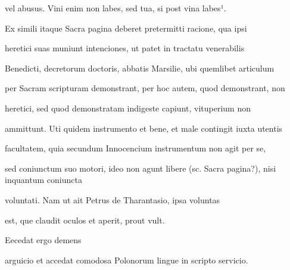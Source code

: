 vel abusus. Vini enim non labes, sed tua, si post vina labes¹.

Ex simili itaque Sacra pagina deberet pretermitti racione, qua ipsi

heretici suas muniunt intenciones, ut patet in tractatu venerabilis

Benedicti, decretorum doctoris, abbatis Marsilie, ubi quemlibet articulum

per Sacram scripturam demonstrant, per hoc autem, quod demonstrant, non 

 heretici, sed quod demonstratam indigeste capiunt, vituperium non

ammittunt. Uti quidem instrumento et bene, et male contingit iuxta utentis

facultatem, quia secundum Innocencium instrumentum non agit per se,

sed coniunctum suo motori, ideo non agunt libere (sc. Sacra pagina?), nisi inquantum coniuncta 

 voluntati. Nam ut ait Petrus de Tharantasio, ipsa voluntas

\splitlines{}

est, que claudit oculos et aperit, prout vult.

\indentK Eecedat ergo demens 



\fullpreviouslines


{
\color{blue}

arguicio et accedat comodosa Polonorum lingue in scripto servicio.

}



